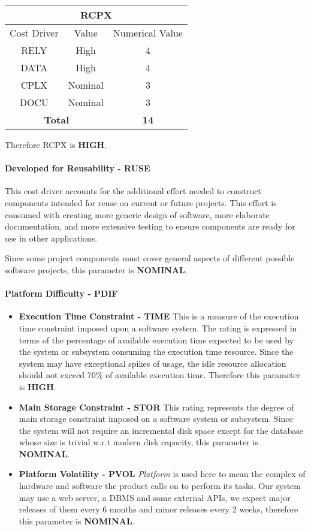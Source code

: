 \begin{longtable}{ccc}
\multicolumn{3}{c}{\textbf{RCPX}}\\
\toprule
Cost Driver&Value&Numerical Value\\
\midrule
RELY&High&4\\
DATA&High&4\\
CPLX&Nominal&3\\
DOCU&Nominal&3\\
\midrule
\multicolumn{2}{c}{\textbf{Total}}&\textbf{14}\\
\bottomrule
\end{longtable}

Therefore RCPX is \textbf{HIGH}.

\paragraph{Developed for Reusability - RUSE} This cost driver accounts for the additional effort needed to construct components intended for reuse on current or future projects. This effort is consumed with creating more generic design of software, more elaborate documentation, and more extensive testing to ensure components are ready for use in other applications.

Since some project components must cover general aspects of different possible software projects, this parameter is \textbf{NOMINAL}.

\paragraph{Platform Difficulty - PDIF}
\begin{itemize}
	\item \textbf{Execution Time Constraint - TIME} This is a measure of the execution time constraint imposed upon a software system. The rating is expressed in terms of the percentage of available execution time expected to be used by the system or subsystem consuming the execution time resource. Since the system may have exceptional spikes of usage, the idle resource allocation should not exceed 70\% of available execution time. Therefore this parameter is \textbf{HIGH}.
	\item \textbf{Main Storage Constraint - STOR} This rating represents the degree of main storage constraint imposed on a software system or subsystem. Since the system will not require an incremental disk space except for the database whose size is trivial w.r.t modern disk capacity, this parameter is \textbf{NOMINAL}.
	\item \textbf{Platform Volatility - PVOL} \emph{Platform} is used here to mean the complex of hardware and software the product calls on to perform its tasks. Our system may use a web server, a DBMS and some external APIs, we expect major releases of them every 6 months and minor releases every 2 weeks, therefore this parameter is \textbf{NOMINAL}.
\end{itemize}

